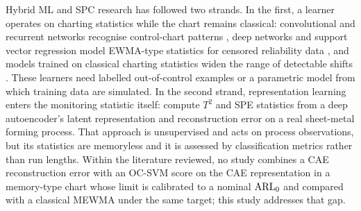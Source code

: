 Hybrid ML and SPC research has followed two strands. In the first, a learner operates on charting
statistics while the chart remains classical: convolutional and recurrent networks recognise
control-chart patterns \citep{yu_control_2021}, deep networks and support vector regression model
EWMA-type statistics for censored reliability data \citep{lee_residual_2023,lee_monitoring_2024},
and models trained on classical charting statistics widen the range of detectable shifts
\citep{mukhtiar_enhanced_2025}. These learners need labelled out-of-control examples or a parametric
model from which training data are simulated. In the second strand, representation learning enters
the monitoring statistic itself: \citet{biegel_deep_2022} compute $T^2$ and SPE statistics from a
deep autoencoder's latent representation and reconstruction error on a real sheet-metal forming
process. That approach is unsupervised and acts on process observations, but its statistics are
memoryless and it is assessed by classification metrics rather than run lengths. Within the
literature reviewed, no study combines a CAE reconstruction error with an OC-SVM score on the CAE
representation in a memory-type chart whose limit is calibrated to a nominal $\mathrm{ARL}_0$ and compared
with a classical MEWMA under the same target; this study addresses that gap.
